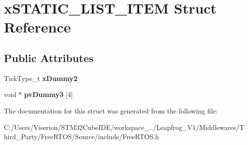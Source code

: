 \hypertarget{structx_s_t_a_t_i_c___l_i_s_t___i_t_e_m}{}\section{x\+S\+T\+A\+T\+I\+C\+\_\+\+L\+I\+S\+T\+\_\+\+I\+T\+EM Struct Reference}
\label{structx_s_t_a_t_i_c___l_i_s_t___i_t_e_m}
\subsection*{Public Attributes}
\begin{DoxyCompactItemize}
\item 
\mbox{\label{structx_s_t_a_t_i_c___l_i_s_t___i_t_e_m_a902f5a362987a85e76338f233e16817e}} 
Tick\+Type\+\_\+t {\bfseries x\+Dummy2}
\item 
\mbox{\label{structx_s_t_a_t_i_c___l_i_s_t___i_t_e_m_ac8df611d8ab21275ef688b0ca7ca352c}} 
void $\ast$ {\bfseries pv\+Dummy3} \mbox{[}4\mbox{]}
\end{DoxyCompactItemize}


The documentation for this struct was generated from the following file\+:\begin{DoxyCompactItemize}
\item 
C\+:/\+Users/\+Viserion/\+S\+T\+M32\+Cube\+I\+D\+E/workspace\+\_../\+Leapfrog\+\_\+\+V1/\+Middlewares/\+Third\+\_\+\+Party/\+Free\+R\+T\+O\+S/\+Source/include/Free\+R\+T\+O\+S.\+h\end{DoxyCompactItemize}
